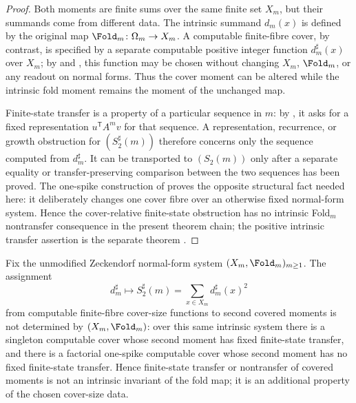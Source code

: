 \begin{proof}
Both moments are finite sums over the same finite set \(X_m\), but their summands
come from different data.  The intrinsic summand \(d_m(x)\) is defined by the
original map \(\Fold_m\colon\Omega_m\to X_m\).  A computable finite-fibre cover,
by contrast, is specified by a separate computable positive integer function
\(d_m^\sharp(x)\) over \(X_m\); by  and
, this function may be chosen without
changing \(X_m\), \(\Fold_m\), or any readout on normal forms.  Thus the cover
moment can be altered while the intrinsic fold moment remains the moment of the
unchanged map.

Finite-state transfer is a property of a particular sequence in \(m\): by
, it asks for a fixed representation
\(u^{\mathsf T}A^m v\) for that sequence.  A representation, recurrence, or
growth obstruction for \((S_2^\sharp(m))\) therefore concerns only the sequence
computed from \(d_m^\sharp\).  It can be transported to \((S_2(m))\) only after a
separate equality or transfer-preserving comparison between the two sequences has
been proved.  The one-spike construction of
 proves the opposite structural
fact needed here: it deliberately changes one cover fibre over an otherwise
fixed normal-form system.  Hence the cover-relative finite-state obstruction has
no intrinsic Fold\(_m\) nontransfer consequence in the present theorem chain; the
positive intrinsic transfer assertion is the separate theorem
.
\end{proof}

\begin{proposition}
\label{prop:cover-category-invariance-finite-state-obstruction}
\label{thm:cover-relative-transfer-is-not-intrinsic}
Fix the unmodified Zeckendorf normal-form system \((X_m,\Fold_m)_{m\ge1}\).  The
assignment
\[
  d_m^\sharp\longmapsto S_2^\sharp(m)=\sum_{x\in X_m}d_m^\sharp(x)^2
\]
from computable finite-fibre cover-size functions to second covered moments is
not determined by \((X_m,\Fold_m)\): over this same intrinsic system there is a
singleton computable cover whose second moment has fixed finite-state transfer,
and there is a factorial one-spike computable cover whose second moment has no
fixed finite-state transfer.  Hence finite-state transfer or nontransfer of
covered moments is not an intrinsic invariant of the fold map; it is an
additional property of the chosen cover-size data.
\end{proposition}

